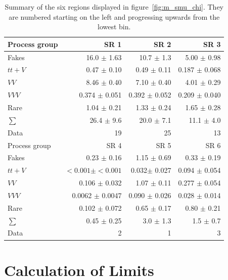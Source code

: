 \begin{table}[!htbp]
  \centering
  \begin{tabular}{|l|r|r|r|}
    \hline
    Process group & SR 1              & SR 2              & SR 3              \\ \hline
    Fakes         & 16.0 $\pm$ 1.63   & 10.7 $\pm$ 1.3    & 5.00 $\pm$ 0.98   \\ 
    $tt+V$        & 0.47 $\pm$ 0.10   & 0.49 $\pm$ 0.11   & 0.187 $\pm$ 0.068 \\ 
    $VV$          & 8.46 $\pm$ 0.40   & 7.10 $\pm$ 0.40   & 4.01 $\pm$ 0.29   \\
    $VVV$         & 0.374 $\pm$ 0.051 & 0.392 $\pm$ 0.052 & 0.209 $\pm$ 0.040 \\ 
    Rare          & 1.04 $\pm$ 0.21   & 1.33 $\pm$ 0.24   & 1.65 $\pm$ 0.28   \\ \hline
    $\sum$        & 26.4 $\pm$ 9.6    & 20.0 $\pm$ 7.1      & 11.1 $\pm$ 4.0    \\ \hline
    Data          & 19                & 25                & 13                \\ \hline \hline
    Process group & SR 4                & SR 5              & SR 6              \\ \hline
    Fakes         & 0.23 $\pm$ 0.16     & 1.15 $\pm$ 0.69   & 0.33 $\pm$ 0.19   \\
    $tt+V$        & $<0.001 \pm <0.001$ & 0.032$\pm$ 0.027  & 0.094 $\pm$ 0.054 \\
    $VV$          & 0.106 $\pm$ 0.032   & 1.07 $\pm$ 0.11   & 0.277 $\pm$ 0.054 \\
    $VVV$         & 0.0062 $\pm$ 0.0047 & 0.090 $\pm$ 0.026 & 0.028 $\pm$ 0.014 \\
    Rare          & 0.102 $\pm$ 0.072   & 0.65 $\pm$ 0.17   & 0.80 $\pm$ 0.21   \\ \hline
    $\sum$        & 0.45 $\pm$ 0.25     & 3.0 $\pm$ 1.3     & 1.5 $\pm$ 0.7     \\ \hline
    Data          & 2                   & 1                 & 3                 \\ \hline
  \end{tabular}
  \caption{Summary of the six regions displayed in figure~\ref{fig:m_smu_chi}. They are numbered starting on the left and progressing upwards from the lowest bin.}
  \label{tab:m_smu_chi_summary}
\end{table}

\section{Calculation of Limits}
\label{sec:calc-of-limits}

